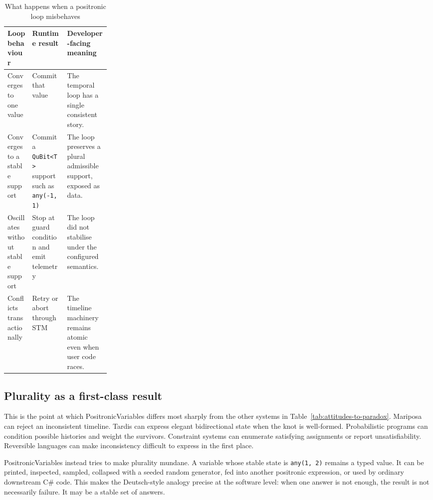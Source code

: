 \documentclass[a4paper,11pt]{article}
\begin{document}
\begin{table}[htbp]
  \centering
  \begin{tabularx}{\linewidth}{@{}
    >{\raggedright\arraybackslash}p{0.24\linewidth}
    >{\raggedright\arraybackslash}X
    >{\raggedright\arraybackslash}X
  @{}}
    \toprule
    \textbf{Loop behaviour} & \textbf{Runtime result} & \textbf{Developer-facing meaning} \\
    \midrule
    Converges to one value &
    Commit that value &
    The temporal loop has a single consistent story. \\

    Converges to a stable support &
    Commit a \texttt{QuBit<T>} support such as \texttt{any(-1, 1)} &
    The loop preserves a plural admissible support, exposed as data. \\

    Oscillates without stable support &
    Stop at guard condition and emit telemetry &
    The loop did not stabilise under the configured semantics. \\

    Conflicts transactionally &
    Retry or abort through STM &
    The timeline machinery remains atomic even when user code races. \\
    \bottomrule
  \end{tabularx}
  \caption{What happens when a positronic loop misbehaves}
  \label{tab:loop-misbehaviour}
\end{table}

\subsection{Plurality as a first-class result}

This is the point at which PositronicVariables differs most sharply from the other
systems in Table~\ref{tab:attitudes-to-paradox}. Mariposa can reject an inconsistent
timeline. Tardis can express elegant bidirectional state when the knot is well-formed.
Probabilistic programs can condition possible histories and weight the survivors.
Constraint systems can enumerate satisfying assignments or report unsatisfiability.
Reversible languages can make inconsistency difficult to express in the first place.

PositronicVariables instead tries to make plurality mundane. A variable whose stable
state is \texttt{any(1, 2)} remains a typed value. It can be printed, inspected, sampled,
collapsed with a seeded random generator, fed into another positronic expression, or
used by ordinary downstream C\# code. This makes the Deutsch-style analogy precise
at the software level: when one answer is not enough, the result is not necessarily
failure. It may be a stable set of answers.
\end{document}
